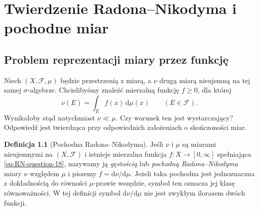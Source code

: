 \documentclass[11pt,a4paper,oneside]{book}
\numberwithin{equation}{chapter}
\theoremstyle{plain}
\theoremstyle{definition}
\newtheorem{definicja}[twierdzenie]{Definicja}
\theoremstyle{remark}
\begin{document}


\chapter[Twierdzenie Radona--Nikodyma]{Twierdzenie Radona--Nikodyma i pochodne miar}
\label{ch:radon-nikodym-18}

\section{Problem reprezentacji miary przez funkcję}
Niech $(X,\mathcal F,\mu)$ będzie przestrzenią z miarą,
a $\nu$ drugą miarą nieujemną na tej samej $\sigma$-algebrze.
Chcielibyśmy znaleźć mierzalną funkcję $f\ge0$, dla której
\begin{equation}\label{eq:RN-question-18}
\nu(E)=\int_E f(x)\,\mathrm d\mu(x)
\qquad(E\in\mathcal F).
\end{equation}
Wynikałoby stąd natychmiast $\nu\ll\mu$.
Czy warunek ten jest wystarczający? Odpowiedź jest twierdząca
przy odpowiednich założeniach o skończoności miar.

\begin{definicja}[Pochodna Radona--Nikodyma]
\label{def:RN-derivative-18}
Jeśli $\nu$ i $\mu$ są miarami nieujemnymi na $(X,\mathcal F)$
i istnieje mierzalna funkcja $f:X\to[0,\infty]$
spełniająca \eqref{eq:RN-question-18}, nazywamy ją
\emph{gęstością} lub \emph{pochodną Radona--Nikodyma}
miary $\nu$ względem $\mu$ i piszemy
$f=\mathrm d\nu/\mathrm d\mu$. Jeżeli taka pochodna
jest jednoznaczna z dokładnością do równości $\mu$-prawie
wszędzie, symbol ten oznacza jej klasę równoważności.
W tej definicji symbol $\mathrm d\nu/\mathrm d\mu$
nie jest zwykłym ilorazem dwóch funkcji.
\end{definicja}
\end{document}
